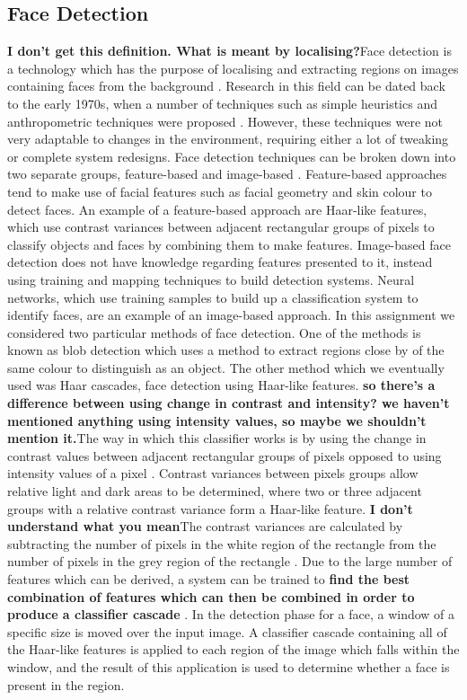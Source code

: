 \documentclass[conference]{IEEEtran}
\begin{document}
\subsection{Face Detection}
\textbf{I don't get this definition. What is meant by localising?}Face detection is a technology which has the purpose of localising and extracting regions on images containing faces from the background \cite{hjelmaas2001face}. Research in this field can be dated back to the early 1970s, when a number of techniques such as simple heuristics and anthropometric techniques were proposed \cite{hjelmaas2001face}. However, these techniques were not very adaptable to changes in the environment, requiring either a lot of tweaking or complete system redesigns. Face detection techniques can be broken down into two separate groups, feature-based and image-based \cite{hjelmaas2001face}. Feature-based approaches tend to make use of facial features such as facial geometry and skin colour to detect faces. An example of a feature-based approach are Haar-like features, which use contrast variances between adjacent rectangular groups of pixels to classify objects and faces by combining them to make features. Image-based face detection does not have knowledge regarding features presented to it, instead using training and mapping techniques to build detection systems. Neural networks, which use training samples to build up a classification system to identify faces, are an example of an image-based approach. In this assignment we considered two particular methods of face detection. One of the methods is known as blob detection which uses a method to extract regions close by of the same colour to distinguish as an object. The other method which we eventually used was Haar cascades, face detection using Haar-like features. \textbf{so there's a difference between using change in contrast and intensity? we haven't mentioned anything using intensity values, so maybe we shouldn't mention it.}The way in which this classifier works is by using the change in contrast values between adjacent rectangular groups of pixels opposed to using intensity values of a pixel \cite{wilson2006facial}. Contrast variances between pixels groups allow relative light and dark areas to be determined, where two or three adjacent groups with a relative contrast variance form a Haar-like feature. \textbf{I don't understand what you mean}The contrast variances are calculated by subtracting the number of pixels in the white region of the rectangle from the number of pixels in the grey region of the rectangle \cite{viola2004robust}. Due to the large number of features which can be derived, a system can be trained to \textbf{find the best combination of features which can then be combined in order to produce a classifier cascade} \cite{viola2004robust}. In the detection phase for a face, a window of a specific size is moved over the input image. A classifier cascade containing all of the Haar-like features is applied to each region of the image which falls within the window, and the result of this application is used to determine whether a face is present in the region.
\end{document}

